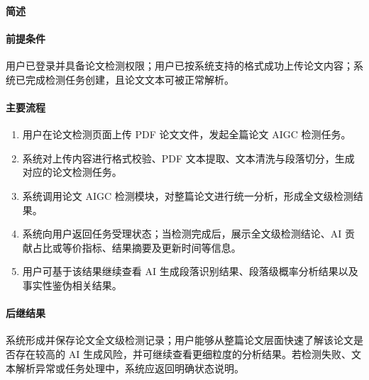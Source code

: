 \subsubsection{}

\paragraph*{简述}


\paragraph*{前提条件}

用户已登录并具备论文检测权限；用户已按系统支持的格式成功上传论文内容；系统已完成检测任务创建，且论文文本可被正常解析。

\paragraph*{主要流程}

\begin{enumerate}
    \item 用户在论文检测页面上传 PDF 论文文件，发起全篇论文 AIGC 检测任务。
    \item 系统对上传内容进行格式校验、PDF 文本提取、文本清洗与段落切分，生成对应的论文检测任务。
    \item 系统调用论文 AIGC 检测模块，对整篇论文进行统一分析，形成全文级检测结果。
    \item 系统向用户返回任务受理状态；当检测完成后，展示全文级检测结论、AI 贡献占比或等价指标、结果摘要及更新时间等信息。
    \item 用户可基于该结果继续查看 AI 生成段落识别结果、段落级概率分析结果以及事实性鉴伪相关结果。
\end{enumerate}

\paragraph*{后继结果}

系统形成并保存论文全文级检测记录；用户能够从整篇论文层面快速了解该论文是否存在较高的 AI 生成风险，并可继续查看更细粒度的分析结果。若检测失败、文本解析异常或任务处理中，系统应返回明确状态说明。

